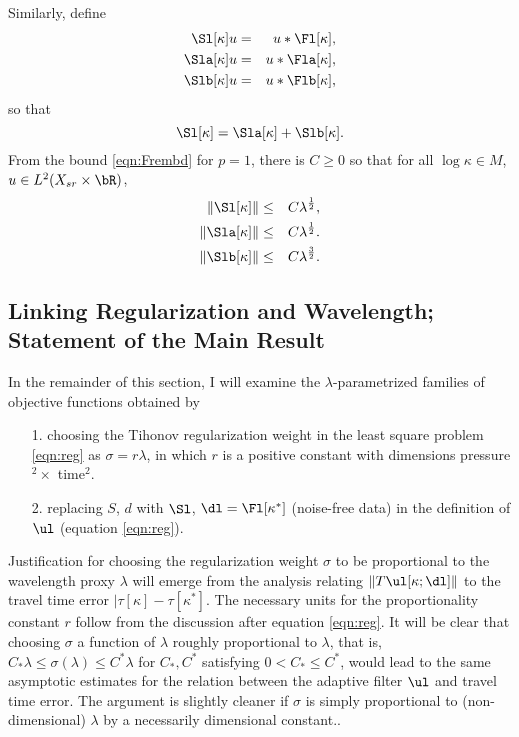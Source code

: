 Similarly, define
\begin{eqnarray}
  \label{eqn:sdeflam}
  \Sl[\kappa]u &=& u *\Fl[\kappa],  \nonumber \\
  \Sla[\kappa]u &=& u *\Fla[\kappa], \nonumber\\
  \Slb[\kappa]u &=& u *\Flb[\kappa], 
\end{eqnarray}
so that
\[
  \Sl[\kappa] = \Sla[\kappa] + \Slb[\kappa].
\]
From the bound \ref{eqn:Frembd} for $p=1$, there is $C \ge 0$ so that
for all $\log \kappa \in M$, $u \in L^2(X_{sr} \times \bR)$,
\begin{eqnarray}
  \label{eqn:Srembd}
  \|\Sl[\kappa]\| &\le&  C\lambda^{\frac{1}{2}},\nonumber \\
  \|\Sla[\kappa]\|& \le& C\lambda^{\frac{1}{2}}. \nonumber \\
  \|\Slb[\kappa]\| & \le& C\lambda^{\frac{3}{2}}.
\end{eqnarray}

\subsection{Linking Regularization and Wavelength; Statement of the
  Main Result}
In the remainder of this section, I will examine the $\lambda$-parametrized families of
objective functions obtained by
\begin{itemize}
\item[1. ] choosing the Tihonov regularization weight in the least
  square problem \ref{eqn:reg} as $\sigma = r\lambda$, in which $r$ is
  a positive constant with dimensions pressure$^2 \times $ time$^2$.
\item[2. ]replacing $S$, $d$ with $\Sl$, $\dl =\Fl[\kappa^*]$
  (noise-free data) in the definition of $\ul$ (equation \ref{eqn:reg}).
\end{itemize}

Justification for choosing the regularization weight $\sigma$ to be
proportional to
the wavelength proxy $\lambda$ will emerge from the analysis relating
$\|T\ul[\kappa;\dl]\|$ to the travel
time error $|\tau[\kappa]-\tau[\kappa^*]$. The necessary units for the
proportionality constant $r$ follow from the discussion after equation
\ref{eqn:reg}. It will be clear that choosing $\sigma$ a function of
$\lambda$ roughly proportional to $\lambda$, that is, $C_*\lambda \le
\sigma(\lambda) \le C^*\lambda$ for $C_*,C^*$ satisfying $0 < C_* \le
C^*$, would lead to the same asymptotic estimates for the relation
between the adaptive filter $\ul$ and travel time
error. The argument is slightly cleaner if $\sigma$ is simply
proportional to (non-dimensional) $\lambda$ by a necessarily
dimensional constant..

